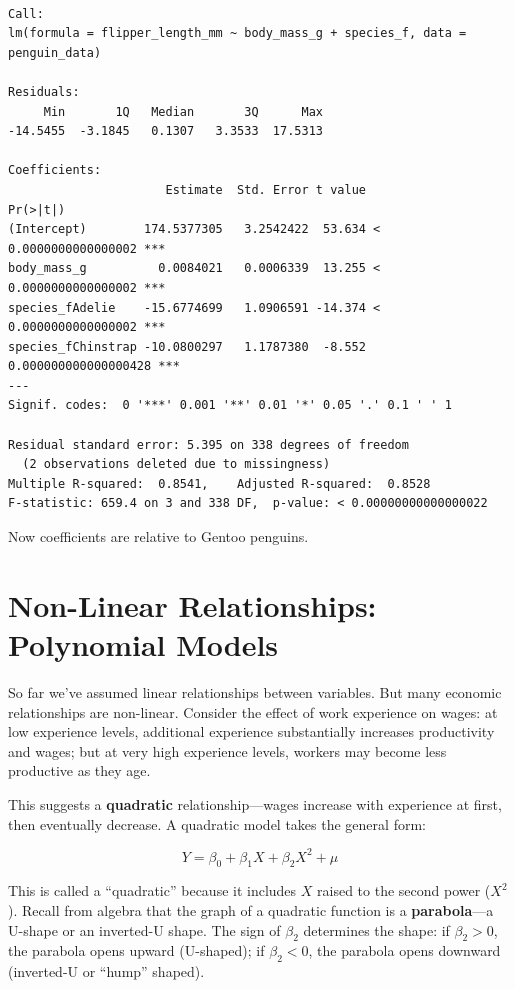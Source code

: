 \documentclass[
  letterpaper,
  DIV=11,
  numbers=noendperiod]{scrreprt}
\begin{document}
\begin{verbatim}

Call:
lm(formula = flipper_length_mm ~ body_mass_g + species_f, data = penguin_data)

Residuals:
     Min       1Q   Median       3Q      Max 
-14.5455  -3.1845   0.1307   3.3533  17.5313 

Coefficients:
                      Estimate  Std. Error t value             Pr(>|t|)    
(Intercept)        174.5377305   3.2542422  53.634 < 0.0000000000000002 ***
body_mass_g          0.0084021   0.0006339  13.255 < 0.0000000000000002 ***
species_fAdelie    -15.6774699   1.0906591 -14.374 < 0.0000000000000002 ***
species_fChinstrap -10.0800297   1.1787380  -8.552 0.000000000000000428 ***
---
Signif. codes:  0 '***' 0.001 '**' 0.01 '*' 0.05 '.' 0.1 ' ' 1

Residual standard error: 5.395 on 338 degrees of freedom
  (2 observations deleted due to missingness)
Multiple R-squared:  0.8541,    Adjusted R-squared:  0.8528 
F-statistic: 659.4 on 3 and 338 DF,  p-value: < 0.00000000000000022
\end{verbatim}

Now coefficients are relative to Gentoo penguins.

\section{Non-Linear Relationships: Polynomial
Models}\label{non-linear-relationships-polynomial-models}

So far we've assumed linear relationships between variables. But many
economic relationships are non-linear. Consider the effect of work
experience on wages: at low experience levels, additional experience
substantially increases productivity and wages; but at very high
experience levels, workers may become less productive as they age.

This suggests a \textbf{quadratic} relationship---wages increase with
experience at first, then eventually decrease. A quadratic model takes
the general form:

\[
Y = \beta_0 + \beta_1 X + \beta_2 X^2 + \mu
\]

This is called a ``quadratic'' because it includes \(X\) raised to the
second power (\(X^2\)). Recall from algebra that the graph of a
quadratic function is a \textbf{parabola}---a U-shape or an inverted-U
shape. The sign of \(\beta_2\) determines the shape: if \(\beta_2 > 0\),
the parabola opens upward (U-shaped); if \(\beta_2 < 0\), the parabola
opens downward (inverted-U or ``hump'' shaped).
\end{document}
